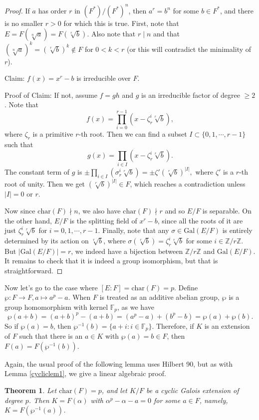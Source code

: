 \documentclass[12pt]{report}
\newtheorem{theorem}{Theorem}[section]
\theoremstyle{definition}
\newcommand{\charr}{\text{char}}
\newcommand{\Gal}{\text{Gal}}
\newcommand{\ZZ}{\mathbb{Z}}
\newcommand{\FF}{\mathbb{F}}
\begin{document}
\begin{proof}
	If $a$ has order $r$ in $(F^*)/(F^*)^n$, then $a^r=b^n$ for some $b\in F^*$, and there is no smaller $r>0$ for which this is true. First, note that $E=F(\sqrt[n]{a})=F(\sqrt[r]{b})$. Also note that $r\mid n$ and that $(\sqrt[n]{a})^k=(\sqrt[r]{b})^k\notin F$ for $0<k<r$ (or this will contradict the minimality of $r$).

	Claim: $f(x)=x^r-b$ is irreducible over $F$.

	Proof of Claim: If not, assume $f=gh$ and $g$ is an irreducible factor of degree $\geq 2$.  Note that $$f(x)=\prod_{i=0}^{r-1}(x-\zeta_r^i \sqrt[r]{b}),$$ where $\zeta_r$ is a primitive $r$-th root. Then we can find a subset $I\subset \{0,1,\cdots,r-1\}$ such that $$g(x)=\prod_{i\in I}(x-\zeta_r^i\sqrt[r]{b}).$$ The constant term of $g$ is $\pm\prod_{i\in I}(\sigma_r^i \sqrt[r]{b})=\pm \zeta' (\sqrt[r]{b})^{|I|},$ where $\zeta'$ is a $r$-th root of unity. Then we get $(\sqrt[r]{b})^{|I|}\in F$, which reaches a contradiction unless $|I|=0$ or $r$.

	Now since $\charr(F)\nmid n$, we also have $\charr(F)\nmid r$ and so $E/F$ is separable. On the other hand, $E/F$ is the splitting field of $x^r-b$, since all the roots of it are just $\zeta_r^i \sqrt[r]{b}$ for $i=0,1,\cdots,r-1$. Finally, note that any $\sigma\in \Gal(E/F)$ is entirely determined by its action on $\sqrt[r]{b}$, where $\sigma(\sqrt[r]{b})=\zeta_r^i \sqrt[r]{b}$ for some $i\in \ZZ/r\ZZ$. But $|\Gal(E/F)|=r$, we indeed have a bijection between $\ZZ/r\ZZ$  and $\Gal(E/F)$. It remains to check that it is indeed a group isomorphism, but that is straightforward.
\end{proof}

Now let's go to the case where $[E:F]=\charr(F)=p$. Define $\wp: F\to F, a\mapsto a^p-a$. When $F$ is treated as an additive abelian group, $\wp$ is a group homomorphism with kernel $\FF_p$, as we have $$\wp(a+b)=(a+b)^p-(a+b)=(a^p-a)+(b^p-b)=\wp(a)+\wp(b).$$
So if $\wp(a)=b$, then $\wp^{-1}(b)=\{a+i: i\in \FF_p\}$. Therefore, if $K$ is an extension of $F$ such that there is an $a\in K$ with $\wp(a)=b\in F$, then $F(a)=F(\wp^{-1}(b))$.

Again, the usual proof of the following lemma uses Hilbert 90, but as with Lemma \ref{cycliclem1}, we give a linear algebraic proof.

\begin{theorem}\label{9.8}
	Let $\charr(F)=p$, and let $K/F$ be a cyclic Galois extension of degree $p$. Then $K=F(\alpha)$ with $\alpha^p-\alpha-a=0$ for some $a\in F$, namely, $K=F(\wp^{-1}(a))$.
\end{theorem}
\end{document}
